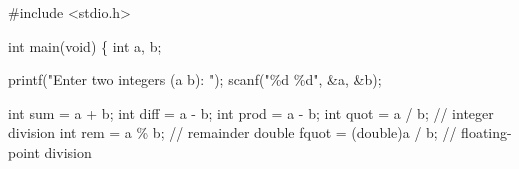 \documentclass[
  letterpaper,
  DIV=11,
  numbers=noendperiod]{scrreprt}
\newenvironment{Shaded}{\begin{snugshade}}{\end{snugshade}}
\newcommand{\CommentTok}[1]{\textcolor[rgb]{0.37,0.37,0.37}{#1}}
\newcommand{\DataTypeTok}[1]{\textcolor[rgb]{0.68,0.00,0.00}{#1}}
\newcommand{\ImportTok}[1]{\textcolor[rgb]{0.00,0.46,0.62}{#1}}
\newcommand{\NormalTok}[1]{\textcolor[rgb]{0.00,0.23,0.31}{#1}}
\newcommand{\OperatorTok}[1]{\textcolor[rgb]{0.37,0.37,0.37}{#1}}
\newcommand{\PreprocessorTok}[1]{\textcolor[rgb]{0.68,0.00,0.00}{#1}}
\newcommand{\SpecialCharTok}[1]{\textcolor[rgb]{0.37,0.37,0.37}{#1}}
\newcommand{\StringTok}[1]{\textcolor[rgb]{0.13,0.47,0.30}{#1}}
\begin{document}
\begin{Shaded}
\begin{Highlighting}[]
\PreprocessorTok{\#include }\ImportTok{\textless{}stdio.h\textgreater{}}

\DataTypeTok{int}\NormalTok{ main}\OperatorTok{(}\DataTypeTok{void}\OperatorTok{)} \OperatorTok{\{}
    \DataTypeTok{int}\NormalTok{ a}\OperatorTok{,}\NormalTok{ b}\OperatorTok{;}

\NormalTok{    printf}\OperatorTok{(}\StringTok{"Enter two integers (a b): "}\OperatorTok{);}
\NormalTok{    scanf}\OperatorTok{(}\StringTok{"}\SpecialCharTok{\%d}\StringTok{ }\SpecialCharTok{\%d}\StringTok{"}\OperatorTok{,} \OperatorTok{\&}\NormalTok{a}\OperatorTok{,} \OperatorTok{\&}\NormalTok{b}\OperatorTok{);}

    \DataTypeTok{int}\NormalTok{ sum }\OperatorTok{=}\NormalTok{ a }\OperatorTok{+}\NormalTok{ b}\OperatorTok{;}
    \DataTypeTok{int}\NormalTok{ diff }\OperatorTok{=}\NormalTok{ a }\OperatorTok{{-}}\NormalTok{ b}\OperatorTok{;}
    \DataTypeTok{int}\NormalTok{ prod }\OperatorTok{=}\NormalTok{ a }\OperatorTok{{-}}\NormalTok{ b}\OperatorTok{;}
    \DataTypeTok{int}\NormalTok{ quot }\OperatorTok{=}\NormalTok{ a }\OperatorTok{/}\NormalTok{ b}\OperatorTok{;}         \CommentTok{// integer division}
    \DataTypeTok{int}\NormalTok{ rem  }\OperatorTok{=}\NormalTok{ a }\OperatorTok{\%}\NormalTok{ b}\OperatorTok{;}         \CommentTok{// remainder}
    \DataTypeTok{double}\NormalTok{ fquot }\OperatorTok{=} \OperatorTok{(}\DataTypeTok{double}\OperatorTok{)}\NormalTok{a }\OperatorTok{/}\NormalTok{ b}\OperatorTok{;}  \CommentTok{// floating{-}point division}


\end{Highlighting}
\end{Shaded}
\end{document}
